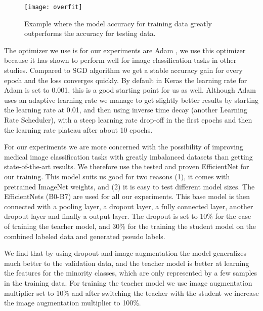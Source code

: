 \documentclass[thesis.tex]{subfiles}
\begin{document}
\begin{figure} %
  \begin{center}
    \texttt{[image: overfit]}
    \caption[Example where the model accuracy for training data greatly outperforms the accuracy for testing data]{Example where the model accuracy for training data greatly outperforms the accuracy for testing data.}
    \label{fig:overfit}
  \end{center}
\end{figure}

The optimizer we use is for our experiments are Adam \cite{AdamMethod17}, we use this optimizer because it has shown to perform well for image classification tasks in other studies. Compared to SGD algorithm we get a stable accuracy gain for every epoch and the loss converges quickly. By default in Keras the learning rate for Adam is set to 0.001, this is a good starting point for us as well. Although Adam uses an adaptive learning rate we manage to get slightly better results by starting the learning rate at 0.01, and then using inverse time decay (another Learning Rate Scheduler), with a steep learning rate drop-off in the first epochs and then the learning rate plateau after about 10 epochs.

For our experiments we are more concerned with the possibility of improving medical image classification tasks with greatly imbalanced datasets than getting state-of-the-art results. We therefore use the tested and proven EfficientNet for our training. This model suits us good for two reasons (1), it comes with pretrained ImageNet weights, and (2) it is easy to test different model sizes. The EfficientNets (B0-B7) are used for all our experiments. This base model is then connected with a pooling layer, a dropout layer, a fully connected layer, another dropout layer and finally a output layer. The dropout is set to 10\% for the case of training the teacher model, and 30\% for the training the student model on the combined labeled data and generated pseudo labels. 

We find that by using dropout and image augmentation the model generalizes much better to the validation data, and the teacher model is better at learning the features for the minority classes, which are only represented by a few samples in the training data. For training the teacher model we use image augmentation multiplier set to 10\% and after switching the teacher with the student we increase the image augmentation multiplier to 100\%.
\end{document}
